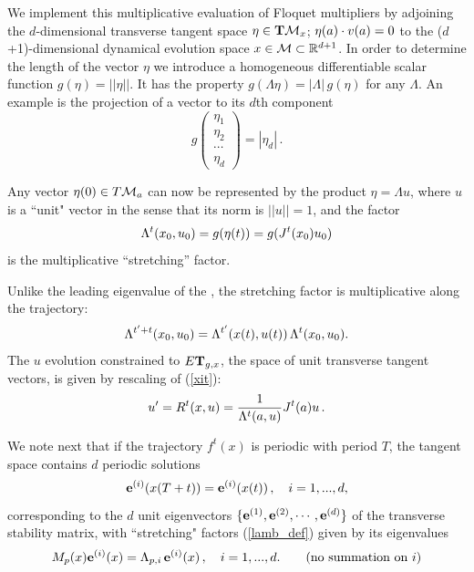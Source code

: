 We implement this multiplicative evaluation
of Floquet multipliers by adjoining
the $d$-dimensional transverse tangent space
$\eta \in {\bf T} \pS_x$; $\eta(\ssp) \cdot \vel(\ssp)=0$
to the ($d$+1)-dimensional dynamical evolution
space $x\in \pS \subset \reals^{d+1}$.
In order to determine the length of the vector $\eta$
we introduce a homogeneous
differentiable scalar function $g(\eta)=||\eta||$.
It has  the property $g(\Lambda \eta)=|\Lambda | \, g(\eta)$
for any $\Lambda $.
An example is the projection of a vector to its $d$th component
\[  %
 g \left( \begin{array}{c}
	\eta_1 \\
	\eta_2 \\
	\cdots \\
	\eta_d
\end{array} \right)= |\eta_d| \,.
\] %

Any vector $\eta(0) \in T\pS_{\ssp}$ can now be represented by the product
$
\eta=\Lambda {u}
$,
where $ {u}$ is a ``unit" vector in the sense that its
norm is $||{u}||=1$, and the factor
\begin{equation}
\Lambda^t(x_0,{u}_0)=g(\eta(t)) = g(\jMps^t(x_0) {u}_0)
\label{lamb_def}
\end{equation}
is the multiplicative ``stretching'' factor.

Unlike the leading eigenvalue of the \jacobianM, the stretching factor is
multiplicative along the trajectory:
\[
\ExpaEig^{t'+t}(x_0,{u}_0)=\ExpaEig^{t'}(x(t),{u}(t))
				\, \ExpaEig^t(x_0,{u}_0).
\]
The ${u}$ evolution constrained to $E {\bf T}_{g,x}$, the space of unit transverse
tangent vectors,
is given by rescaling of (\ref{xit}):
\begin{equation}
{u}'
=R^t(x,{u})=
\frac{1}{\ExpaEig^t(\ssp,{u})} \jMps^t(\ssp) {u} \, .
\label{R}
\end{equation}

We note  next that if the trajectory $f^t(x)$ is periodic with
period $T$, the tangent space contains $d$ periodic solutions
\[
\jEigvec[i](x(T+t))=\jEigvec[i](x(t)) \,, \quad i=1,...,d ,
\]
corresponding to the $d$ unit eigenvectors $\{\jEigvec[1],
\jEigvec[2], \cdots, \jEigvec[d]\}$ of the transverse stability
matrix, with ``stretching" factors (\ref{lamb_def})  given by
its eigenvalues
\[
\monodromy_p(x) \jEigvec[i](x) = \ExpaEig_{p,i} \, \jEigvec[i](x)
\,, \quad i=1,...,d.
\qquad \mbox{(no summation on $i$)}
\]

